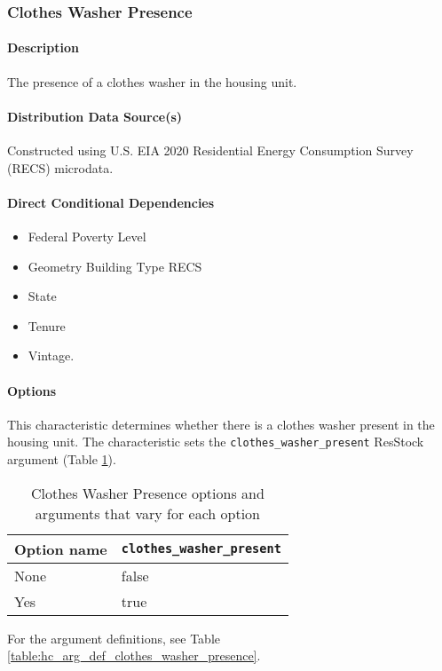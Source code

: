\subsubsection{Clothes Washer Presence}\label{clothes_washer_presence}
\paragraph{Description}
The presence of a clothes washer in the housing unit.

\paragraph{Distribution Data Source(s)}
Constructed using U.S. EIA 2020 Residential Energy Consumption Survey (RECS) microdata. 

\paragraph{Direct Conditional Dependencies}
\begin{itemize}
    \item Federal Poverty Level
    \item Geometry Building Type RECS
    \item State
    \item Tenure
    \item Vintage.
\end{itemize}

\paragraph{Options}
This characteristic determines whether there is a clothes washer present in the housing unit. The characteristic sets the \texttt{clothes\_washer\_present} ResStock argument (Table \ref{table:opt_def_clothes_washer}).

\begin{longtable}[]{ |p{2.5cm}|p{3cm}| }
\caption{Clothes Washer Presence options and arguments that vary for each option} \label{table:opt_def_clothes_washer} \\
\toprule\noalign{}
Option name & \texttt{clothes\_washer\_present} \\
\midrule\noalign{}
\endhead
\bottomrule\noalign{}
\endlastfoot
None & false \\
Yes & true \\
\end{longtable}

For the argument definitions, see Table \ref{table:hc_arg_def_clothes_washer_presence}.

